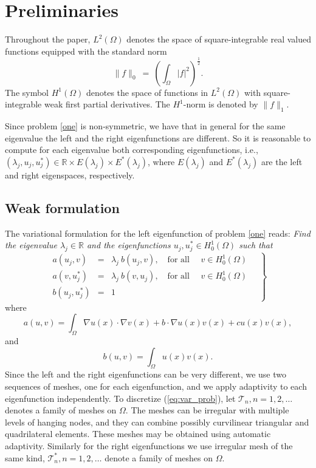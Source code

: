 \documentclass[smallextended]{svjour3}
\newcommand{\cT}{\mathcal{T}}
\begin{document}

\section{Preliminaries}\label{sec:preli}

Throughout the paper, $L^2(\Omega)$
denotes the space of square-integrable real valued functions
equipped with the standard norm
\begin{equation}\label{eq:l2}
\|f\|_{0}\ = \ \left(\int_\Omega  |f|^2\right)^{\frac{1}{2}} .
\end{equation}
The symbol $H^1(\Omega)$ denotes the space of functions in $L^2(\Omega)$
with square-integrable weak first partial derivatives. The $H^1$-norm is 
denoted by $\|f\|_1$.

Since problem \eqref{one} is non-symmetric, we have that in general for the same eigenvalue the left and the right eigenfunctions are different. So it is reasonable to compute for each eigenvalue both corresponding eigenfunctions, i.e., $(\lambda_j,u_j,u_j^*)\in \mathbb{R}\times E(\lambda_j)\times E^*(\lambda_j)$, where $E(\lambda_j)$ and $E^*(\lambda_j)$ are the left and right eigenspaces, respectively.

\subsection{Weak formulation}

The variational formulation for the left eigenfunction of problem \eqref{one} reads:
\emph{Find the eigenvalue $\lambda_j\in \mathbb{R}$ and the eigenfunctions $u_j,u_j^*\in H^1_0(\Omega)$
such that}
\begin{equation}
\label{eq:var_prob}
\left.
\begin{array}{lcl}
a(u_j,v)&=& \lambda_j\ b(u_j,v),
\quad \text{for all } \quad v  \in H^1_0(\Omega)\\
a(v,u_j^*)&=& \lambda_j\ b(v,u_j),
\quad \text{for all } \quad v  \in H^1_0(\Omega)\\
 b(u_j,u_j^*) &=& 1
\end{array}\quad
\right\}
\end{equation}
where
\begin{equation}\label{eq:a}
a(u,v)=\int_\Omega \nabla u(x)\cdot \nabla v(x) + b\cdot \nabla u(x) v(x) + cu(x)v(x),
\end{equation}
and
\begin{equation}\label{eq:b}
b(u,v)=\int_\Omega u(x) v(x).
\end{equation}
Since the left and the right eigenfunctions can be very different, we use two sequences of meshes, one for each eigenfunction, and we apply adaptivity to each eigenfunction independently. 
To discretize (\ref{eq:var_prob}), let $\cT_n, n =
1,2,\ldots $ denotes a family of meshes on $\Omega$.
The meshes can be irregular with multiple levels of hanging nodes, 
and they can combine possibly curvilinear triangular and quadrilateral 
elements. These meshes may be obtained using automatic adaptivity. 
Similarly for the right eigenfunctions we use irregular mesh of the same kind,  $\cT_n^*, n =
1,2,\ldots $ denote a family of meshes on $\Omega$.
\end{document}
